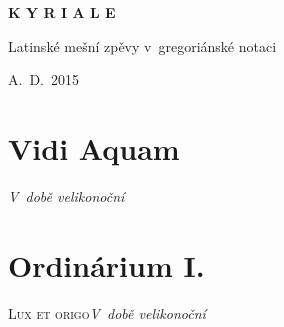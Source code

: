 \documentclass[12pt]{article} %
\newcommand{\info}[2]{\large\textsc{#1}\hfill{\em #2}}
\begin{document}
\begin{titlepage}
  \begin{center}

    { \vspace*{60 mm} }
    \begin{Huge}\textbf{K Y R I A L E}\end{Huge}

    \vspace{30 mm}
    \begin{Large}{Latinské mešní zpěvy v~gregoriánské notaci}\end{Large}

    \vspace{110 mm}
    \begin{large}{A.~D.~2015}\end{large}

  \end{center}
\end{titlepage}





\def\greinitialformat#1{{\fontsize{43}{43}\selectfont #1}}

\redlines





\section{Vidi Aquam}
\info{}{V~době velikonoční}

\vspace{0.5 cm}

\vspace{1 cm}




\section{Ordinárium I.}
\info{Lux et origo}{V~době velikonoční}
\end{document}
